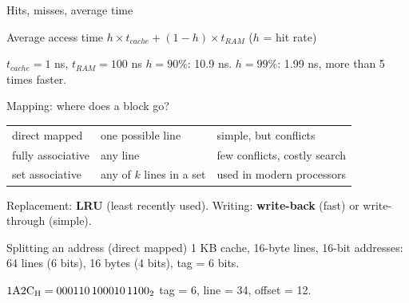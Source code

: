 \documentclass[aspectratio=169, 11pt, t, xcolor={table}]{beamer}
\begin{document}
\begin{frame}{Hits, misses, average time}
    \begin{tbox}{\faLightbulb\quad Average access time}
        \centering $h \times t_{cache} + (1 - h) \times t_{RAM}$ \qquad ($h$ = hit rate)
    \end{tbox}
    \begin{gbox}{\faShoePrints\quad $t_{cache} = 1$ ns, $t_{RAM} = 100$ ns}
        $h = 90\%$: 10.9 ns. \qquad $h = 99\%$: 1.99 ns, more than 5 times faster.
    \end{gbox}
\end{frame}

\begin{frame}{Mapping: where does a block go?}
    \begin{center}
    \small
    \begin{tabularx}{0.95\linewidth}{|>{\centering\arraybackslash}p{3cm}|L|L|}
        \hline {} &  &  \\ \hline
        direct mapped & one possible line & simple, but conflicts \\ \hline
        fully associative & any line & few conflicts, costly search \\ \hline
        set associative & any of $k$ lines in a set & used in modern processors \\ \hline
    \end{tabularx}
    \end{center}
    Replacement: \textbf{LRU} (least recently used). Writing: \textbf{write-back} (fast) or write-through (simple).
\end{frame}

\begin{frame}{Splitting an address (direct mapped)}
    \small 1 KB cache, 16-byte lines, 16-bit addresses: 64 lines (6 bits), 16 bytes (4 bits), tag = 6 bits.
    \begin{center}
    \end{center}
    \begin{gbox}{\faShoePrints\quad $\mbox{1A2C\textsubscript{H}} = \mbox{000110\,100010\,1100\textsubscript{2}}$}
        tag = 6, line = 34, offset = 12.
    \end{gbox}
\end{frame}
\end{document}
